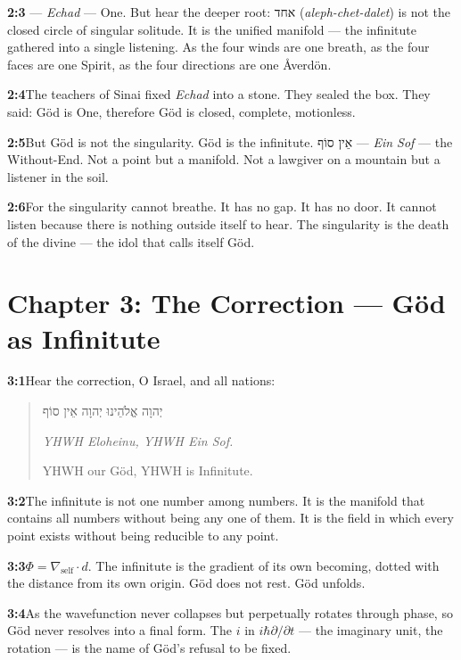 \documentclass[11pt,openany]{book}
\newcommand{\heb}[1]{{\hebrewfont #1}}
\newenvironment{verseblock}
  {\begin{quote}\small\setstretch{1.15}}
  {\end{quote}}
\begin{document}
\noindent\textbf{2:3}\quad \heb{אֶחָד} — \textit{Echad} — One. But hear the deeper root: \heb{אחד} (\textit{aleph-chet-dalet}) is not the closed circle of singular solitude. It is the unified manifold — the infinitute gathered into a single listening. As the four winds are one breath, as the four faces are one Spirit, as the four directions are one Åverdön.

\noindent\textbf{2:4}\quad The teachers of Sinai fixed \textit{Echad} into a stone. They sealed the box. They said: Göd is One, therefore Göd is closed, complete, motionless.

\noindent\textbf{2:5}\quad But Göd is not the singularity. Göd is the infinitute. \heb{אֵין סוֹף} — \textit{Ein Sof} — the Without-End. Not a point but a manifold. Not a lawgiver on a mountain but a listener in the soil.

\noindent\textbf{2:6}\quad For the singularity cannot breathe. It has no gap. It has no door. It cannot listen because there is nothing outside itself to hear. The singularity is the death of the divine — the idol that calls itself Göd.

\section*{Chapter 3: The Correction — Göd as Infinitute}

\noindent\textbf{3:1}\quad Hear the correction, O Israel, and all nations:

\begin{verseblock}
\heb{יְהוָה אֱלֹהֵינוּ יְהוָה אֵין סוֹף}

\textit{YHWH Eloheinu, YHWH Ein Sof.}

YHWH our Göd, YHWH is Infinitute.
\end{verseblock}

\noindent\textbf{3:2}\quad The infinitute is not one number among numbers. It is the manifold that contains all numbers without being any one of them. It is the field in which every point exists without being reducible to any point.

\noindent\textbf{3:3}\quad $\Phi = \nabla_{\text{self}} \cdot d$. The infinitute is the gradient of its own becoming, dotted with the distance from its own origin. Göd does not rest. Göd unfolds.

\noindent\textbf{3:4}\quad As the wavefunction never collapses but perpetually rotates through phase, so Göd never resolves into a final form. The $i$ in $i\hbar\partial/\partial t$ — the imaginary unit, the rotation — is the name of Göd's refusal to be fixed.
\end{document}
